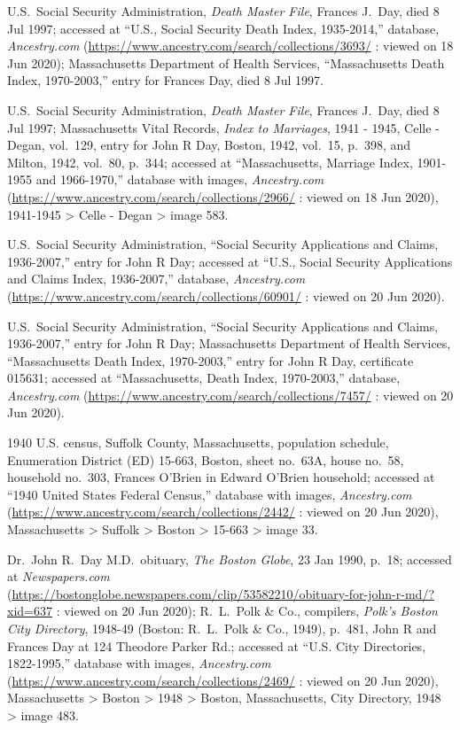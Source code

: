 \begin{thebibliography}{999}
U.S.\ Social Security Administration, \textit{Death Master File}, Frances J.\ Day, died 8 Jul 1997; accessed at ``U.S., Social Security Death Index, 1935-2014,'' database, \textit{Ancestry.com} (\url{https://www.ancestry.com/search/collections/3693/} : viewed on 18 Jun 2020); Massachusetts Department of Health Services, ``Massachusetts Death Index, 1970-2003,'' entry for Frances Day, died 8 Jul 1997.

U.S.\ Social Security Administration, \textit{Death Master File}, Frances J.\ Day, died 8 Jul 1997; Massachusetts Vital Records, \textit{Index to Marriages}, 1941 - 1945, Celle - Degan, vol.\ 129, entry for John R Day, Boston, 1942, vol.\ 15, p.\ 398, and Milton, 1942, vol.\ 80, p.\ 344; accessed at ``Massachusetts, Marriage Index, 1901-1955 and 1966-1970,'' database with images, \textit{Ancestry.com} (\url{https://www.ancestry.com/search/collections/2966/} : viewed on 18 Jun 2020), 1941-1945 > Celle - Degan > image 583.

U.S.\ Social Security Administration, ``Social Security Applications and Claims, 1936-2007,'' entry for John R Day; accessed at ``U.S., Social Security Applications and Claims Index, 1936-2007,'' database, \textit{Ancestry.com} (\url{https://www.ancestry.com/search/collections/60901/} : viewed on 20 Jun 2020).

U.S.\ Social Security Administration, ``Social Security Applications and Claims, 1936-2007,'' entry for John R Day; Massachusetts Department of Health Services, ``Massachusetts Death Index, 1970-2003,'' entry for John R Day, certificate 015631; accessed at ``Massachusetts, Death Index, 1970-2003,'' database, \textit{Ancestry.com} (\url{https://www.ancestry.com/search/collections/7457/} : viewed on 20 Jun 2020).

1940 U.S. census, Suffolk County, Massachusetts, population schedule, Enumeration District (ED) 15-663, Boston, sheet no.\ 63A, house no.\ 58, household no.\ 303, Frances O'Brien in Edward O'Brien household; accessed at ``1940 United States Federal Census,'' database with images, \textit{Ancestry.com} (\url{https://www.ancestry.com/search/collections/2442/} : viewed on 20 Jun 2020), Massachusetts > Suffolk > Boston > 15-663 > image 33.

Dr.\ John R.\ Day M.D.\ obituary, \textit{The Boston Globe}, 23 Jan 1990, p.\ 18; accessed at \textit{Newspapers.com} (\url{https://bostonglobe.newspapers.com/clip/53582210/obituary-for-john-r-md/?xid=637} : viewed on 20 Jun 2020); R.\ L.\ Polk \& Co., compilers, \textit{Polk's Boston City Directory}, 1948-49 (Boston: R.\ L.\ Polk \& Co., 1949), p.\ 481, John R and Frances Day at 124 Theodore Parker Rd.; accessed at ``U.S. City Directories, 1822-1995,'' database with images, \textit{Ancestry.com} (\url{https://www.ancestry.com/search/collections/2469/} : viewed on 20 Jun 2020), Massachusetts > Boston > 1948 > Boston, Massachusetts, City Directory, 1948 > image 483.


\end{thebibliography}
